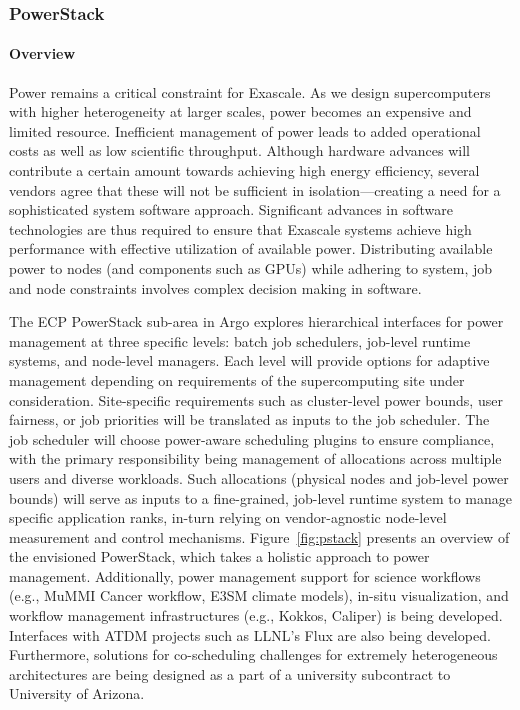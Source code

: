 \subsubsection*{PowerStack}

\paragraph{Overview} 
Power remains a critical constraint for Exascale. As we design supercomputers with higher heterogeneity at larger scales, power becomes an expensive and limited resource. Inefficient management of power leads to added operational costs as well as low scientific throughput. Although hardware advances will contribute a certain amount towards achieving high energy efficiency, several vendors agree that these will not be sufficient in isolation---creating a need for a sophisticated system software approach. Significant advances in software technologies are thus required to ensure that Exascale systems achieve high performance with effective utilization of available power. Distributing available power to nodes (and components such as GPUs) while adhering to system, job and node constraints involves complex decision making in software. 

The ECP PowerStack sub-area in Argo explores hierarchical interfaces for power management at three specific levels: batch job schedulers, job-level runtime systems, and node-level managers. Each level will provide options for adaptive management depending on requirements of the supercomputing site under consideration. Site-specific requirements such as cluster-level power bounds, user fairness, or job priorities will be translated as inputs to the job scheduler. The job scheduler will choose power-aware scheduling plugins to ensure compliance, with the primary responsibility being management of allocations across multiple users and diverse workloads. Such allocations (physical nodes and job-level power bounds) will serve as inputs to a fine-grained, job-level runtime system to manage specific application ranks, in-turn relying on vendor-agnostic node-level measurement and control mechanisms. Figure~\ref{fig:pstack} presents an overview of the envisioned PowerStack, which takes a holistic approach to power management.  Additionally, power management support for science workflows (e.g., MuMMI Cancer workflow, E3SM climate models), in-situ visualization, and workflow management infrastructures (e.g., Kokkos, Caliper) is being developed. Interfaces with ATDM projects such as LLNL's Flux are also being developed. Furthermore, solutions for co-scheduling challenges for extremely heterogeneous architectures are being designed as a part of a university subcontract to University of Arizona. 

